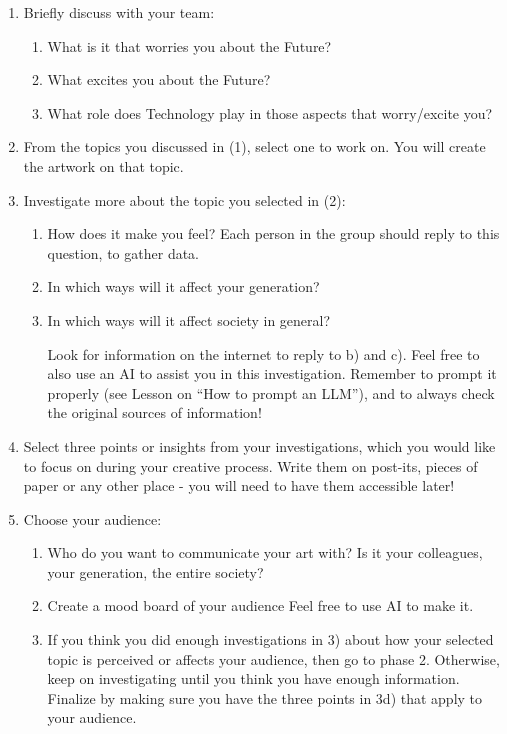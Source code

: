 \documentclass[12pt]{article}
\newcounter{question}
\begin{document}
\begin{enumerate}
\item Briefly discuss with your team:

    \begin{enumerate}
    \item What is it that worries you about the Future?
    \item What excites you about the Future?
    \item What role does Technology play in those aspects that worry/excite you?
    \end{enumerate}

\item From the topics you discussed in (1), select one to work on. You will create the artwork on that topic.

\item Investigate more about the topic you selected in (2):
    \begin{enumerate}
    \item How does it make you feel? Each person in the group should reply to this question, to gather data.
    \item In which ways will it affect your generation?
    \item In which ways will it affect society in general?
    
    Look for information on the internet to reply to b) and c). Feel free to also use an AI to assist you in this investigation. Remember to prompt it properly (see Lesson on “How to prompt an LLM”), and to always check the original sources of information!
    \end{enumerate}
    
\item Select three points or insights from your investigations, which you would like to focus on during your creative process. Write them on post-its, pieces of paper or any other place - you will need to have them accessible later!

\item Choose your audience:
    \begin{enumerate}
    \item Who do you want to communicate your art with? Is it your colleagues, your generation, the entire society?
    \item Create a mood board of your audience
    Feel free to use AI to make it. 
    \item If you think you did enough investigations in 3) about how your selected topic is perceived or affects your audience, then go to phase 2. Otherwise, keep on investigating until you think you have enough information. Finalize by making sure you have the three points in 3d) that apply to your audience.
    \end{enumerate}
\end{enumerate}
\end{document}
